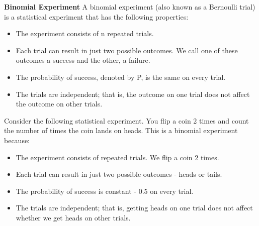 \documentclass[]{report}
\begin{document}
			\noindent \textbf{Binomial Experiment}
			A binomial experiment (also known as a Bernoulli trial) is a statistical experiment that has the following properties:
			\begin{itemize}
				\item The experiment consists of n repeated trials.
				\item Each trial can result in just two possible outcomes. We call one of these outcomes a success and the other, a failure.
				\item The probability of success, denoted by P, is the same on every trial.
				\item The trials are independent; that is, the outcome on one trial does not affect the outcome on other trials.
			\end{itemize}
			
Consider the following statistical experiment. You flip a coin 2 times and count the number of times the coin lands on heads. This is a binomial experiment because:
						\begin{itemize}
							\item The experiment consists of repeated trials. We flip a coin 2 times.
							\item Each trial can result in just two possible outcomes - heads or tails.
							\item The probability of success is constant - 0.5 on every trial.
							\item The trials are independent; that is, getting heads on one trial does not affect whether we get heads on other trials.
						\end{itemize}
\end{document}
